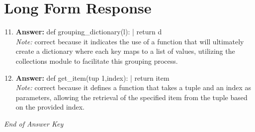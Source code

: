 \documentclass[12pt]{article}
\begin{document}
\section*{Long Form Response}
\begin{enumerate}[label=\arabic*.]
\setcounter{enumi}{10}
\item \textbf{Answer:} def grouping\_dictionary(l): | return d
\\ \textit{Note:} correct because it indicates the use of a function that will ultimately create a dictionary where each key maps to a list of values, utilizing the collections module to facilitate this grouping process.
\item \textbf{Answer:} def get\_item(tup 1,index): | return item
\\ \textit{Note:} correct because it defines a function that takes a tuple and an index as parameters, allowing the retrieval of the specified item from the tuple based on the provided index.
\end{enumerate}

\vfill
\noindent\textit{End of Answer Key}
\end{document}
